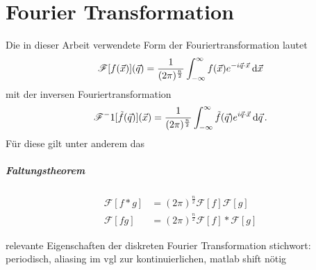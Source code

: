 \chapter{Fourier Transformation}
Die in dieser Arbeit verwendete Form der Fouriertransformation lautet
\begin{equation}
	\mathscr{F} [f(\vec{x})] (\vec{q})
	 =
	 \frac{1}{(2\pi)^\frac{n}{2}}
	 \int_{-\infty}^{\infty}
	 f(\vec{x})
	 e^{-i\vec{q} \cdot \vec{x} } 
	 \dif  \vec{x}
\end{equation}
mit der inversen Fouriertransformation
\begin{equation}
\mathscr{F}^-1 [\tilde{f}(\vec{q})] (\vec{x})
=
\frac{1}{(2\pi)^\frac{n}{2}}
\int_{-\infty}^{\infty}
\tilde{f}(\vec{q})
e^{i\vec{q} \cdot \vec{x} } 
\dif  \vec{q} \, .
\end{equation}
Für diese gilt unter anderem das 
\paragraph{Faltungstheorem}
\begin{align}
 	\mathscr{F} [f\ast g]&=(2\pi)^\frac{n}{2}\mathscr{F}[f] \mathscr{F}[g]\\
 	\mathscr{F}[fg]&=(2\pi)^\frac{n}{2}\mathscr{F}[f]\ast \mathscr{F}[g]
\end{align}

relevante Eigenschaften der diskreten Fourier Transformation
stichwort: periodisch, aliasing im vgl zur kontinuierlichen, matlab shift nötig
